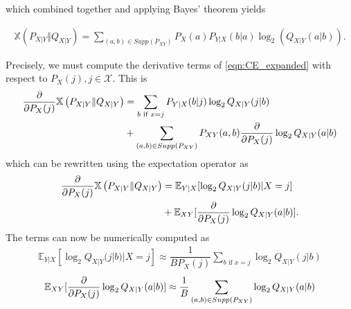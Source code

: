 which combined together and applying Bayes' theorem yields

\begin{align}
\label{eqn:CE_expanded}
	\mathbb{X}\left(P_{X|Y} \Vert Q_{X|Y}\right) = \sum \limits_{(a,b) \in Supp(P_{XY})} P_X(a) P_{Y|X}(b|a) \log_2(Q_{X|Y}(a|b)). 
\end{align}

Precisely, we must compute the derivative terms of \ref{eqn:CE_expanded} with respect to $P_X(j), j \in \mathcal{X}$. This is
\begin{align}
	\pdv{P_X(j)} \mathbb{X}\left(P_{X|Y} \Vert Q_{X|Y}\right) &= \sum \limits_{b \text{ if } x=j} P_{Y|X}(b|j) \log_2 Q_{X|Y}(j|b) \\
	& + \sum \limits_{(a,b) \in Supp(P_{XY})} P_{XY}(a, b) \pdv{P_X(j)} \log_2 Q_{X|Y}(a|b)
\end{align}
which can be rewritten using the expectation operator as
\begin{align}
	\pdv{P_X(j)} \mathbb{X}\left(P_{X|Y} \Vert Q_{X|Y}\right) &= \mathbb{E}_{Y|X}[ \log_2 Q_{X|Y}(j|b)| X=j] \\
	& + \mathbb{E}_{XY}[ \pdv{P_X(j)} \log_2 Q_{X|Y}(a|b)].
\end{align}
The terms can now be numerically computed as
\begin{align}
	\mathbb{E}_{Y|X}[ \log_2 Q_{X|Y}(j|b)| X=j] \approx \dfrac{1}{BP_X(j)}\sum \limits_{b \text{ if } x=j} \log_2 Q_{X|Y}(j|b)
\end{align}
\begin{align}
	\mathbb{E}_{XY}[ \pdv{P_X(j)} \log_2 Q_{X|Y}(a|b)] \approx \dfrac{1}{B} \sum \limits_{(a,b) \in Supp(P_{XY})} \log_2 Q_{X|Y}(a|b)
\end{align}